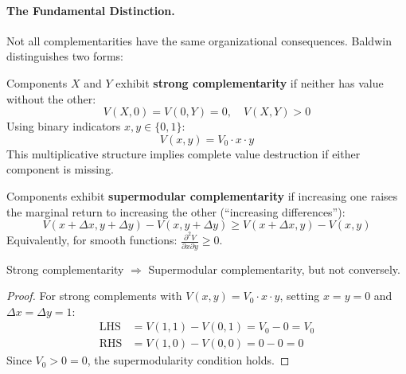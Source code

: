 \paragraph{The Fundamental Distinction.}

Not all complementarities have the same organizational consequences. Baldwin 
distinguishes two forms:

\begin{definition}
\label{def:strong-comp}
Components $X$ and $Y$ exhibit \textbf{strong complementarity} if neither has 
value without the other:
\begin{equation}
V(X, 0) = V(0, Y) = 0, \quad V(X, Y) > 0
\label{eq:strong-comp}
\end{equation}
Using binary indicators $x, y \in \{0, 1\}$:
\begin{equation}
V(x, y) = V_0 \cdot x \cdot y
\end{equation}
This multiplicative structure implies complete value destruction if either 
component is missing.
\end{definition}

\begin{definition}
\label{def:supermod-comp-org}
Components exhibit \textbf{supermodular complementarity} if increasing one raises 
the marginal return to increasing the other (``increasing differences''):
\begin{equation}
V(x + \Delta x, y + \Delta y) - V(x, y + \Delta y) \geq V(x + \Delta x, y) - V(x, y)
\label{eq:increasing-diff}
\end{equation}
Equivalently, for smooth functions: $\frac{\partial^2 V}{\partial x \partial y} \geq 0$.
\end{definition}

\begin{proposition}
\label{prop:strong-subset}
Strong complementarity $\Rightarrow$ Supermodular complementarity, but not conversely.
\end{proposition}

\begin{proof}
For strong complements with $V(x,y) = V_0 \cdot x \cdot y$, setting $x=y=0$ and 
$\Delta x = \Delta y = 1$:
\begin{align*}
\text{LHS} &= V(1,1) - V(0,1) = V_0 - 0 = V_0 \\
\text{RHS} &= V(1,0) - V(0,0) = 0 - 0 = 0
\end{align*}
Since $V_0 > 0 = 0$, the supermodularity condition holds.
\end{proof}

